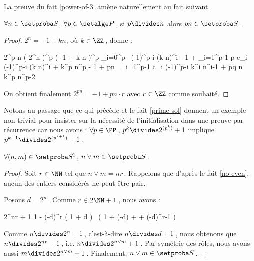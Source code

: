 La preuve du fait \ref{power-of-3} amène naturellement au fait suivant.

\begin{fact} \label{prime-divisor}
	$\forall n \in \ourset$, $\forall p \in \primeset$\,,
	si $p \divides n$ alors $p n \in \ourset$\,.
\end{fact}

\begin{proof}
	$2^n = -1 + k n$, où $k \in \ZZ$\,, donne :

    \medskip
    
    \begin{stepcalc}[style=sar]
    	2^{p n}
    \explnext{}
    	\big( 2^n \big)^p
    \explnext{}
    	\big( -1 + k n \big)^p
    \explnext{}
    	\dsum_{i=0}^p  \, (-1)^{p-i} \cdot (k n)^i
    	- 1 + \dsum_{i=1}^{p-1} p c_i \cdot (-1)^{p-i} \cdot (k n)^i + k^p \cdot n^p
    	- 1 + pn \, \dsum_{i=1}^{p-1} c_i \cdot (-1)^{p-i} \cdot k^i n^{i-1} + pq \cdot n \cdot k^p \cdot n^{p-2}
    \end{stepcalc}

    \medskip

    On obtient finalement $2^{p n} = - 1 + pn \cdot r$ avec $r \in \ZZ$ comme souhaité.
\end{proof}




Notons au passage que ce qui précède et le fait \ref{prime-sol} donnent un exemple non trivial pour insister sur la nécessité de l'initialisation dans une preuve par récurrence car nous avons :
$\forall p \in \PP$\,, $p^k \divides 2^{( p^k )} + 1$ 
implique
$p^{k+1} \divides 2^{( p^{k+1} )} + 1$\,.




\begin{fact} \label{lcm}
	$\forall (n , m) \in \ourset^2$, $n \vee m \in \ourset$\,.
\end{fact}

\begin{proof}
	Soit $r \in \NN$ tel que $n \vee m = n r$\,. Rappelons que d'après le fait \ref{no-even}, aucun des entiers considérés ne peut être pair.
	
	\medskip
	
	Posons $d = 2^n$\,. Comme $r \in 2 \NN + 1$\,, nous avons :
	
	\medskip
	
	\begin{stepcalc}[style = ar*]
		2^{nr} + 1
		1 - (-d)^r
	\explnext{}
		\big( 1 + d \big) \, \big( 1 + (-d) + \cdots + (-d)^{r-1} \big)
	\end{stepcalc}
	
	\medskip
	
	Comme $n \divides 2^n + 1$\,, c'est-à-dire $n \divides d + 1$\,, nous obtenons que $n \divides 2^{nr} + 1$\,, i.e. $n \divides 2^{n \vee m} + 1$\,.
	Par symétrie des rôles, nous avons aussi $m \divides 2^{n \vee m} + 1$\,.
	Finalement, $n \vee m \in \ourset$\,.
\end{proof}


